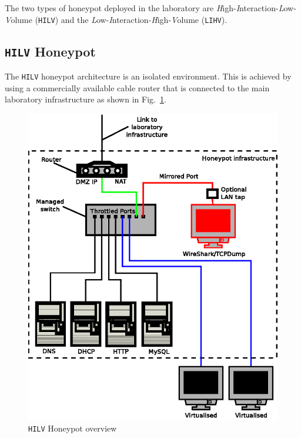 \documentclass{llncs}
\begin{document}
The two types of honeypot deployed in the laboratory are
\emph{H}igh-\emph{I}nteraction-\emph{L}ow-\emph{V}olume (\texttt{HILV}) and the
\emph{L}ow-\emph{I}nteraction-\emph{H}igh-\emph{V}olume (\texttt{LIHV}).

\subsection{\texttt{HILV} Honeypot}

The \texttt{HILV} honeypot architecture is an isolated environment. This is
achieved by using a commercially available cable router that is connected to
the main laboratory infrastructure as shown in Fig.~\ref{fig:HPOverview}.

\begin{figure}[!ht]
\begin{center}
	\includegraphics[scale=0.70]{Images/Honeypot1.eps}
\caption{\texttt{HILV} Honeypot overview}
\label{fig:HPOverview}
\end{center}
\end{figure}
\end{document}
